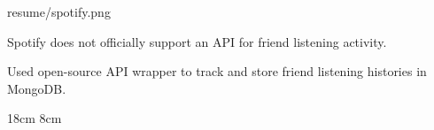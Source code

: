 \begin{cventries}
  \portfolioEntry
    {} %
    {resume/spotify.png} %
    {
      \begin{cvitems} %
        \item {Spotify does not officially support an API for friend listening activity.}
        \item {Used open-source API wrapper to track and store friend listening histories in MongoDB.}
      \end{cvitems}
    }
    {18cm}
    {8cm}

\end{cventries}
